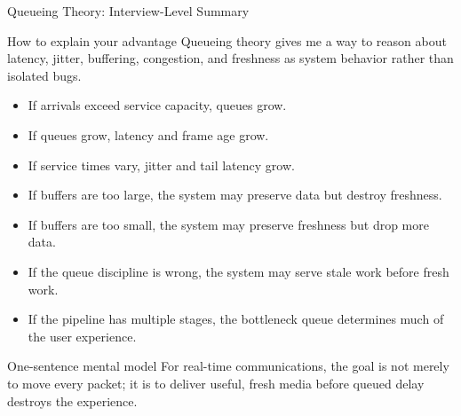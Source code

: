\documentclass[aspectratio=169]{beamer}
\begin{document}
\begin{frame}{Queueing Theory: Interview-Level Summary}
\small

\begin{block}{How to explain your advantage}
Queueing theory gives me a way to reason about latency, jitter, buffering, congestion, and freshness as system behavior rather than isolated bugs.
\end{block}

\begin{itemize}
    \item If arrivals exceed service capacity, queues grow.
    \item If queues grow, latency and frame age grow.
    \item If service times vary, jitter and tail latency grow.
    \item If buffers are too large, the system may preserve data but destroy freshness.
    \item If buffers are too small, the system may preserve freshness but drop more data.
    \item If the queue discipline is wrong, the system may serve stale work before fresh work.
    \item If the pipeline has multiple stages, the bottleneck queue determines much of the user experience.
\end{itemize}

\begin{alertblock}{One-sentence mental model}
For real-time communications, the goal is not merely to move every packet; it is to deliver useful, fresh media before queued delay destroys the experience.
\end{alertblock}

\end{frame}
\end{document}
